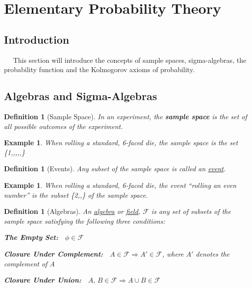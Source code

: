 \documentclass[12pt,a4paper]{article}
\newtheorem{defn}[thm]{Definition}
\newtheorem{ex}[thm]{Example}
\begin{document}
\clearpage
\section{Elementary Probability Theory}

\subsection{Introduction}

$\quad$ This section will introduce the concepts of sample spaces, sigma-algebras, the probability function and the Kolmogorov axioms of probability.
\vspace{12pt}


\subsection{Algebras and Sigma-Algebras}

\begin{defn}[Sample Space]

In an experiment, the \textbf{sample space} is the set of all possible outcomes of the experiment.\end{defn}

\begin{ex}

When rolling a standard, 6-faced die, the sample space is the set \{1,,,,,\}\end{ex}

\begin{defn}[Events]

Any subset of the sample space is called an \underline{event}.\end{defn}

\begin{ex}

When rolling a standard, 6-faced die, the event ``rolling an even number'' is the subset \{2,,\} of the sample space.\end{ex}

\begin{defn}[Algebras]

An \underline{algebra} or \underline{field}, $\mathcal{F}$ is any set of subsets of the sample space satisfying the following three conditions:\par
\vspace{10pt}
{\bf The Empty Set:}$\quad\phi\in\mathcal{F}$\par
\vspace{10pt}
{\bf Closure Under Complement:}$\quad A\in\mathcal{F}\Rightarrow A'\in\mathcal{F}$, where $A'$ denotes the complement of A\par
\vspace{10pt}
{\bf Closure Under Union:}$\quad A,\,B\in\mathcal{F}\Rightarrow A\cup B\in\mathcal{F}$\par
\vspace{12pt}
\end{defn}
\end{document}
